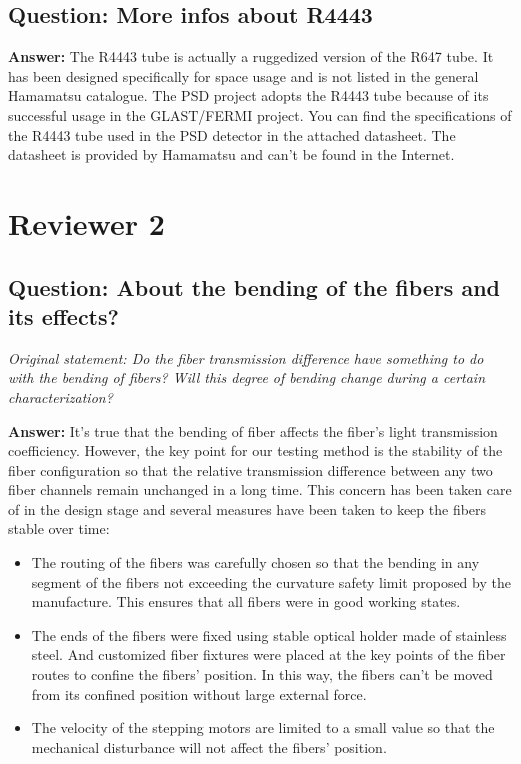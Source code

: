 \documentclass[]{article}
\begin{document}
\subsection{Question: More infos about R4443}

\textbf{Answer:}\newline
The R4443 tube is actually a ruggedized version of the R647 tube. It has been designed specifically for space usage and is not listed in the general Hamamatsu catalogue. The PSD project adopts the R4443 tube because of its successful usage in the GLAST/FERMI project. You can find the specifications of the R4443 tube used in the PSD detector in the attached datasheet. The datasheet is provided by  Hamamatsu and can't be found in the Internet. 

\section{Reviewer 2}
\subsection{Question: About the bending of the fibers and its effects?}
\textit{Original statement: Do the fiber transmission difference have something to do with the bending of fibers?
Will this degree of bending change during a certain characterization?}\newline

\textbf{Answer:}\newline
It's true that the bending of fiber affects the fiber's light transmission coefficiency. However, the key point for our testing method is the stability of the fiber configuration so that the relative transmission difference between any two fiber channels remain unchanged in a long time. This concern has been taken care of in the design stage and several measures have been taken to keep the fibers stable over time:
\begin{itemize}
	\item The routing of the fibers was carefully chosen so that the bending in any segment of the fibers not exceeding the curvature safety limit proposed by the manufacture. This ensures that all fibers were in good working states.
	\item The ends of the fibers were fixed using stable optical holder made of stainless steel. And customized fiber fixtures were placed at the key points of the fiber routes to confine the fibers' position. In this way, the fibers can't be moved from its confined position without large external force.
	\item The velocity of the stepping motors are limited to a small value so that the mechanical disturbance will not affect the fibers' position.
\end{itemize}
\end{document}
